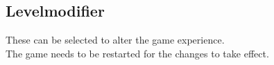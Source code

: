 \documentclass[12pt, a4paper]{scrartcl}
\begin{document}
\begin{Form}
        \def\DefaultHeightofText{12pt}
        \renewcommand*{\LayoutTextField}[2]{%
            \parbox[c][\DefaultHeightofText]{0.5\linewidth}{#1#2}%
        }

        \renewcommand*{\LayoutCheckField}[2]{#2 #1}
        \renewcommand*{\DefaultWidthofCheckBox}{2ex}
        \renewcommand*{\DefaultHeightofCheckBox}{2ex}
        \renewcommand*{\LayoutCheckField}[2]{%
            \parbox[c][\DefaultHeightofCheckBox]{\DefaultWidthofCheckBox}{#2}\enspace%
            \parbox[c][\DefaultHeightofCheckBox]{0.25\linewidth}{#1}%
        }

        \renewcommand*{\DefaultWidthofChoiceMenu}{2.5ex}
        \renewcommand*{\DefaultHeightofChoiceMenu}{2.04ex}

        \begin{multicols}{2}
            \begin{tcolorbox}%
            \end{tcolorbox}


            \columnbreak

            \begin{tcolorbox}
                \TextField[name=info, width=2\linewidth,
                    bordercolor=, backgroundcolor=, readonly]{\strut}
            \end{tcolorbox}
        \end{multicols}

    \subsection*{Levelmodifier}
        These can be selected to alter the game experience.\\
        The game needs to be restarted for the changes to take effect.\smallskip


\end{Form}
\end{document}
